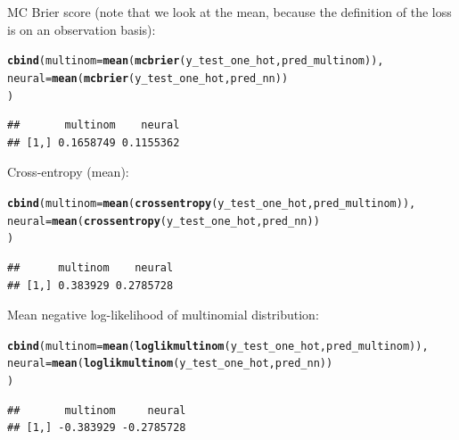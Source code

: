 \documentclass[a4paper]{article}
\makeatletter
\newcommand{\hlstd}[1]{\textcolor[rgb]{0.345,0.345,0.345}{#1}}%
\newcommand{\hlkwc}[1]{\textcolor[rgb]{0.333,0.667,0.333}{#1}}%
\newcommand{\hlkwd}[1]{\textcolor[rgb]{0.737,0.353,0.396}{\textbf{#1}}}%
\newenvironment{kframe}{%
 \def\at@end@of@kframe{}%
 \ifinner\ifhmode%
  \def\at@end@of@kframe{\end{minipage}}%
  \begin{minipage}{\columnwidth}%
 \fi\fi%
 \def\FrameCommand##1{\hskip\@totalleftmargin \hskip-\fboxsep
 \colorbox{shadecolor}{##1}\hskip-\fboxsep
     \hskip-\linewidth \hskip-\@totalleftmargin \hskip\columnwidth}%
 \MakeFramed {\advance\hsize-\width
   \@totalleftmargin\z@ \linewidth\hsize
   \@setminipage}}%
 {\par\unskip\endMakeFramed%
 \at@end@of@kframe}
\newenvironment{knitrout}{}{} %
\makeatother
\begin{document}
{\begin{enumerate}
MC Brier score (note that we look at the mean, because the definition of the loss is on an observation basis):

\begin{knitrout}
\color{fgcolor}\begin{kframe}
\begin{alltt}
\hlkwd{cbind}\hlstd{(}\hlkwc{multinom} \hlstd{=} \hlkwd{mean}\hlstd{(}\hlkwd{mcbrier}\hlstd{(y_test_one_hot, pred_multinom)),}
      \hlkwc{neural} \hlstd{=} \hlkwd{mean}\hlstd{(}\hlkwd{mcbrier}\hlstd{(y_test_one_hot, pred_nn))}
\hlstd{)}
\end{alltt}
\begin{verbatim}
##       multinom    neural
## [1,] 0.1658749 0.1155362
\end{verbatim}
\end{kframe}
\end{knitrout}

Cross-entropy (mean):

\begin{knitrout}
\color{fgcolor}\begin{kframe}
\begin{alltt}
\hlkwd{cbind}\hlstd{(}\hlkwc{multinom} \hlstd{=} \hlkwd{mean}\hlstd{(}\hlkwd{crossentropy}\hlstd{(y_test_one_hot, pred_multinom)),}
      \hlkwc{neural} \hlstd{=} \hlkwd{mean}\hlstd{(}\hlkwd{crossentropy}\hlstd{(y_test_one_hot, pred_nn))}
\hlstd{)}
\end{alltt}
\begin{verbatim}
##      multinom    neural
## [1,] 0.383929 0.2785728
\end{verbatim}
\end{kframe}
\end{knitrout}

Mean negative log-likelihood of multinomial distribution:

\begin{knitrout}
\color{fgcolor}\begin{kframe}
\begin{alltt}
\hlkwd{cbind}\hlstd{(}\hlkwc{multinom} \hlstd{=} \hlkwd{mean}\hlstd{(}\hlkwd{loglikmultinom}\hlstd{(y_test_one_hot, pred_multinom)),}
      \hlkwc{neural} \hlstd{=} \hlkwd{mean}\hlstd{(}\hlkwd{loglikmultinom}\hlstd{(y_test_one_hot, pred_nn))}
\hlstd{)}
\end{alltt}
\begin{verbatim}
##       multinom     neural
## [1,] -0.383929 -0.2785728
\end{verbatim}
\end{kframe}
\end{knitrout}


\end{enumerate}
}
\newpage
\end{document}
